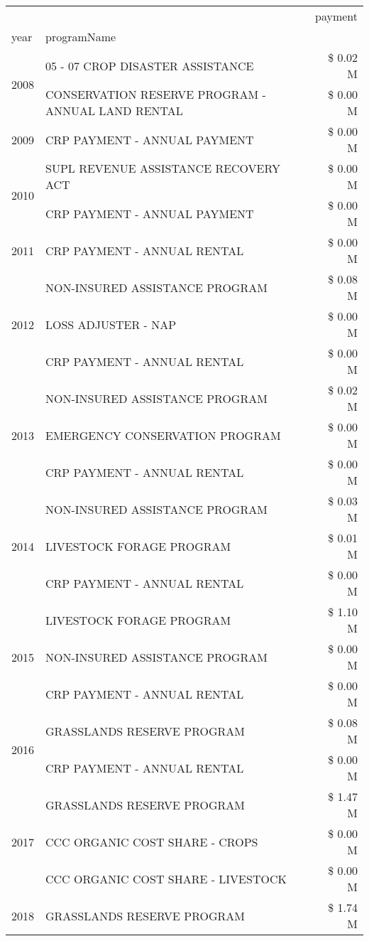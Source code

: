 \begin{tabular}{llr}
\toprule
 &  & payment \\
year & programName &  \\
\midrule
\multirow[t]{2}{*}{2008} & 05 - 07 CROP DISASTER ASSISTANCE & \$ 0.02 M \\
 & CONSERVATION RESERVE PROGRAM - ANNUAL LAND RENTAL & \$ 0.00 M \\
\cline{1-3}
2009 & CRP PAYMENT - ANNUAL PAYMENT & \$ 0.00 M \\
\cline{1-3}
\multirow[t]{2}{*}{2010} & SUPL REVENUE ASSISTANCE RECOVERY ACT & \$ 0.00 M \\
 & CRP PAYMENT - ANNUAL PAYMENT & \$ 0.00 M \\
\cline{1-3}
2011 & CRP PAYMENT - ANNUAL RENTAL & \$ 0.00 M \\
\cline{1-3}
\multirow[t]{3}{*}{2012} & NON-INSURED ASSISTANCE PROGRAM & \$ 0.08 M \\
 & LOSS ADJUSTER - NAP & \$ 0.00 M \\
 & CRP PAYMENT - ANNUAL RENTAL & \$ 0.00 M \\
\cline{1-3}
\multirow[t]{3}{*}{2013} & NON-INSURED ASSISTANCE PROGRAM & \$ 0.02 M \\
 & EMERGENCY CONSERVATION PROGRAM & \$ 0.00 M \\
 & CRP PAYMENT - ANNUAL RENTAL & \$ 0.00 M \\
\cline{1-3}
\multirow[t]{3}{*}{2014} & NON-INSURED ASSISTANCE PROGRAM & \$ 0.03 M \\
 & LIVESTOCK FORAGE PROGRAM & \$ 0.01 M \\
 & CRP PAYMENT - ANNUAL RENTAL & \$ 0.00 M \\
\cline{1-3}
\multirow[t]{3}{*}{2015} & LIVESTOCK FORAGE PROGRAM & \$ 1.10 M \\
 & NON-INSURED ASSISTANCE PROGRAM & \$ 0.00 M \\
 & CRP PAYMENT - ANNUAL RENTAL & \$ 0.00 M \\
\cline{1-3}
\multirow[t]{2}{*}{2016} & GRASSLANDS RESERVE PROGRAM                    & \$ 0.08 M \\
 & CRP PAYMENT - ANNUAL RENTAL                   & \$ 0.00 M \\
\cline{1-3}
\multirow[t]{3}{*}{2017} & GRASSLANDS RESERVE PROGRAM & \$ 1.47 M \\
 & CCC ORGANIC COST SHARE - CROPS & \$ 0.00 M \\
 & CCC ORGANIC COST SHARE - LIVESTOCK & \$ 0.00 M \\
\cline{1-3}
\multirow[t]{3}{*}{2018} & GRASSLANDS RESERVE PROGRAM & \$ 1.74 M \\

\end{tabular}
